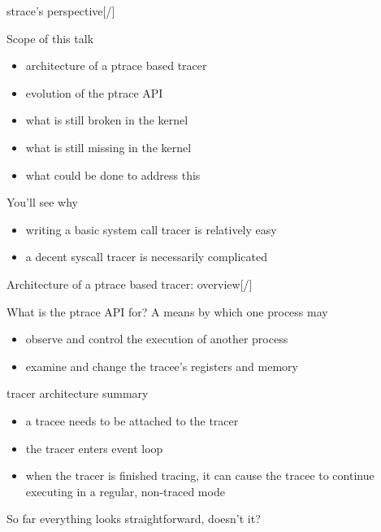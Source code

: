 \documentclass[unicode,aspectratio=169,xcolor={table,dvipsnames,usernames}]{beamer}
\begin{document}
\begin{frame}{\Large strace's perspective\hfill [\insertframenumber/\inserttotalframenumber]}
\Large
\begin{block}{Scope of this talk}
\begin{itemize}
	\item architecture of a ptrace based tracer
	\item evolution of the ptrace API
	\item what is still broken in the kernel
	\item what is still missing in the kernel
	\item what could be done to address this
\end{itemize}
\end{block}

\begin{block}{You'll see why}
\begin{itemize}
	\item writing a basic system call tracer is relatively easy
	\item a decent syscall tracer is necessarily complicated
\end{itemize}
\end{block}
\end{frame}

\begin{frame}{\Large Architecture of a ptrace based tracer: overview\hfill [\insertframenumber/\inserttotalframenumber]}
\Large
\begin{block}{What is the ptrace API for?}
A means by which one process may
\begin{itemize}
	\item observe and control the execution of another process
	\item examine and change the tracee's registers and memory
\end{itemize}
\end{block}

\begin{block}{tracer architecture summary}
\begin{itemize}
	\item a tracee needs to be attached to the tracer
	\item the tracer enters event loop
	\item when the tracer is finished tracing, it can cause the tracee
		to continue executing in a regular, non-traced mode
\end{itemize}
\end{block}

So far everything looks straightforward, doesn't it?
\end{frame}
\end{document}
